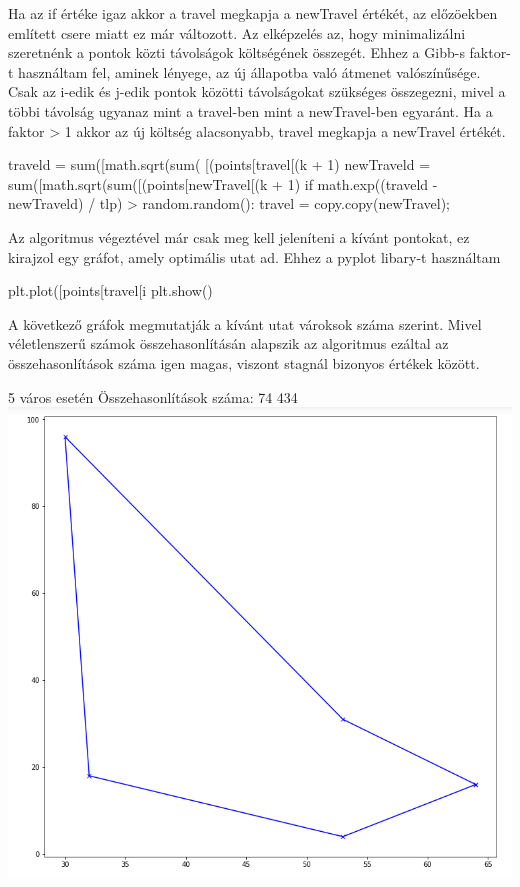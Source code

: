 Ha az if értéke igaz akkor a travel megkapja a newTravel értékét, az előzöekben említett csere miatt ez már változott. Az elképzelés az, hogy minimalizálni szeretnénk a pontok közti távolságok költségének összegét. Ehhez a Gibb-s faktor-t használtam fel, aminek lényege, az új állapotba való átmenet valószínűsége. Csak az i-edik és j-edik pontok közötti távolságokat szükséges összegezni, mivel a többi távolság ugyanaz mint a travel-ben mint a newTravel-ben egyaránt. Ha a faktor > 1 akkor az új költség alacsonyabb, travel megkapja a newTravel értékét.


\begin{python}
traveld = sum([math.sqrt(sum( [(points[travel[(k + 1) %
    newTraveld = sum([math.sqrt(sum([(points[newTravel[(k + 1) %
    if math.exp((traveld - newTraveld) / tlp) > random.random():
        travel = copy.copy(newTravel);
\end{python}        


Az algoritmus végeztével már csak meg kell jeleníteni a kívánt pontokat, ez kirajzol egy gráfot, amely optimális utat ad. Ehhez a pyplot libary-t használtam


\begin{python}
plt.plot([points[travel[i %
plt.show()
\end{python}

A következő gráfok megmutatják a kívánt utat vároksok száma szerint. Mivel véletlenszerű számok összehasonlításán alapszik az algoritmus ezáltal az összehasonlítások száma igen magas, viszont stagnál bizonyos értékek között.


5 város esetén
Összehasonlítások száma: 74 434
\includegraphics[scale=0.4]{images/5.png}

